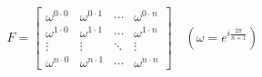 \documentclass[preview]{standalone}
\begin{document}
\begin{align*}
F = \begin{bmatrix} \omega^{0 \cdot 0} & \omega^{0 \cdot 1} & \cdots & \omega^{0 \cdot n} \\ \omega^{1 \cdot 0} & \omega^{1 \cdot 1} & \cdots & \omega^{1 \cdot n} \\ \vdots & \vdots & \ddots & \vdots \\ \omega^{n \cdot 0} & \omega^{n \cdot 1} & \cdots & \omega^{n \cdot n} \end{bmatrix} \quad \left( \omega = e^{i \frac{2\pi}{n+1}} \right)
\end{align*}
\end{document}

